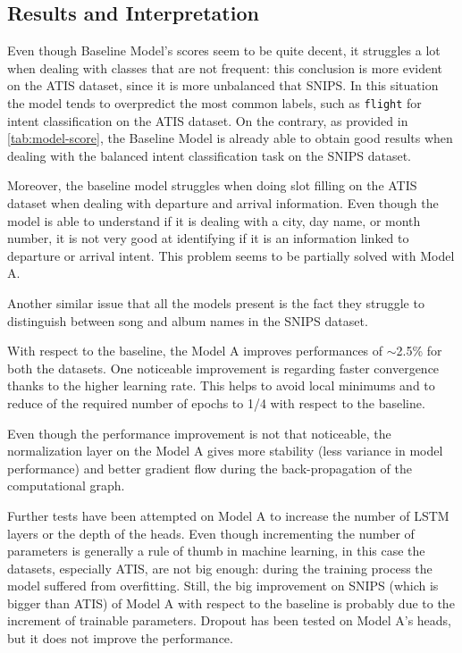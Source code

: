 \documentclass[a4paper]{article}
\begin{document}
\subsection{Results and Interpretation}
Even though Baseline Model's scores seem to be quite decent, it struggles a lot when dealing with classes that are not frequent: this conclusion is more evident on the ATIS dataset, since it is more unbalanced that SNIPS. In this situation the model tends to overpredict the most common labels, such as \texttt{flight} for intent classification on the ATIS dataset. On the contrary, as provided in \cref{tab:model-score}, the Baseline Model is already able to obtain good results when dealing with the balanced intent classification task on the SNIPS dataset. 

Moreover, the baseline model struggles when doing slot filling on the ATIS dataset when dealing with departure and arrival information. Even though the model is able to understand if it is dealing with a city, day name, or month number, it is not very good at identifying if it is an information linked to departure or arrival intent. This problem seems to be partially solved with Model A.

Another similar issue that all the models present is the fact they struggle to distinguish between song and album names in the SNIPS dataset.

With respect to the baseline, the Model A improves performances of $\sim$2.5\% for both the datasets. One noticeable improvement is regarding faster convergence thanks to the higher learning rate. This helps to avoid local minimums and to reduce of the required number of epochs to 1/4 with respect to the baseline.

Even though the performance improvement is not that noticeable, the normalization layer on the Model A gives more stability (less variance in model performance) and better gradient flow during the back-propagation of the computational graph.

Further tests have been attempted on Model A to increase the number of LSTM layers or the depth of the heads. Even though incrementing the number of parameters is generally a rule of thumb in machine learning, in this case the datasets, especially ATIS, are not big enough: during the training process the model suffered from overfitting. Still, the big improvement on SNIPS (which is bigger than ATIS) of Model A with respect to the baseline is probably due to the increment of trainable parameters. Dropout has been tested on Model A's heads, but it does not improve the performance.
\end{document}
